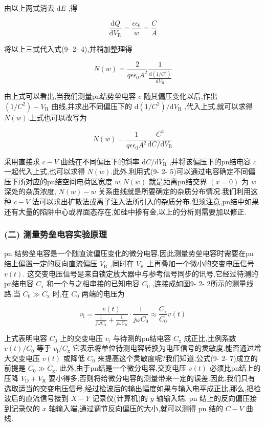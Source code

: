 \documentclass[12pt,a4paper]{article}
\begin{document}
由以上两式消去 \(\mathrm{d}E\) ,得

\[
\frac{\mathrm{d}Q}{\mathrm{d}V_{\mathrm{R}}} = \frac{\epsilon \epsilon_{0}}{w} = \frac{C}{A} \tag{9-2-5}
\]

将以上三式代入式(9- 2- 4),并稍加整理得

\[
N(w) = \frac{2}{q\epsilon\epsilon_{0}A^{2}}\frac{1}{\frac{\mathrm{d}(1 / C^{2})}{\mathrm{d}V_{\mathrm{R}}}}
\]

由上式可以看出,当我们测量pn结势垒电容 \(c\) 随其偏压变化以后,作出 \((1 / C^{2}) - V_{\mathrm{R}}\) 曲线,并求出不同偏压下的 \(\mathrm{d}(1 / C^{2}) / \mathrm{d}V_{\mathrm{R}}\) ,代入上式,就可以求得 \(N(w)\).上式也可以改写为

\[
N(w) = \frac{1}{q\epsilon\epsilon_{0}A^{2}}\frac{C^{3}}{\mathrm{d}C / \mathrm{d}V_{\mathrm{R}}} \tag{9-2-6}
\]

采用直接求 \(c - V\) 曲线在不同偏压下的斜率 \(\mathrm{d}C / \mathrm{d}V_{\mathrm{R}}\) ,并将该偏压下的pn结电容 \(c\) 一起代入上式,也可以求得 \(N(w)\).此外,利用式(9- 2- 5)可以通过电容确定不同偏压下所对应的pn结空间电荷区宽度 \(w,N(w)\) 就是距离pn结交界 \((x = 0)\) 为 \(w\) 深处的杂质浓度, \(N(w) - w\) 关系曲线就是所要确定的杂质分布情况.我们利用这种 \(c - V\) 法可以求出扩散法或离子注入法所引入的杂质分布.但须注意,pn结中如果还有大量的陷阱中心或界面态存在,如硅中掺有金,以上的分析则需要加以修正.

\subsubsection*{(二) 测量势垒电容实验原理}

pn 结势垒电容是一个随直流偏压变化的微分电容,因此测量势垒电容时需要在pn 结上偏置一定的反向直流偏压 \(V_{\mathrm{R}}\) ,同时在 \(V_{\mathrm{R}}\) 上再叠加一个微小的交变电压信号 \(v(t)\). 这交变电压信号是来自锁定放大器中与参考信号同步的讯号,它经过待测的pn结电容 \(C_{\mathrm{x}}\) 和一个与之相串接的已知电容 \(C_{0}\) ,连接成如图9- 2- 2所示的测量线路.当 \(C_{0} \gg C_{\mathrm{x}}\) 时,在 \(C_{0}\) 两端的电压为

\[
v_{\mathrm{i}} = \frac{v(t)}{\frac{1}{j\omega C_{\mathrm{x}}} + \frac{1}{j\omega C_{0}}} \cdot \frac{1}{j\omega C_{0}} \approx \frac{C_{\mathrm{x}}}{C_{0}} v(t) \tag{9-2-7}
\]

上式表明电容 \(C_{0}\) 上的交变电压 \(v_{\mathrm{i}}\) 与待测的pn结电容 \(C_{\mathrm{x}}\) 成正比,比例系数 \(v(t) / C_{0}\) 等于 \(v_{\mathrm{i}} / C_{\mathrm{x}}\) 它表示将单位待测电容转换为电压信号的灵敏度.能否通过增大交变电压 \(v(t)\) 或降低 \(C_{0}\) 来提高这个灵敏度呢?我们知道,公式(9- 2- 7)成立的前提是 \(C_{0} \gg C_{\mathrm{x}}\). 此外,由于pn结是一个微分电容,交变电压 \(v(t)\) 必须比pn结上的压降 \(V_{\mathrm{D}} + V_{\mathrm{R}}\) 要小得多,否则将给微分电容的测量带来一定的误差.因此,我们只有选取适当的交变电压信号,经过检波后的输出幅度如果与输入电平成正比,那么,把检波后的直流信号接到 \(X - Y\) 记录仪(计算机)的 \(y\) 轴输入端, \(\mathrm{pn}\) 结上的反向偏压接到记录仪的 \(x\) 轴输入端,通过调节反向偏压的大小,就可以测得 \(\mathrm{pn}\) 结的 \(C - V\) 曲线.
\end{document}

